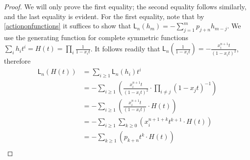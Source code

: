 \documentclass[10pt,a4paper]{amsart}
\newcommand{\LLn}[1][n]{{\mathsf{L}_{#1}}}
\begin{document}
\begin{proof}
    We will only prove the first equality; the second equality follows similarly, and the last equality is evident.
    For the first equality, note that by \eqref{actiononfunctions} it suffices to show that $\LLn(h_m) = - \sum_{j = 1}^m p_{j+n} h_{m-j}$. We use the  generating function for complete symmetric functions $\sum_i h_i t^i = H(t) = \prod_{i} \frac{1}{1-x_i t}$. It follows readily that $\LLn[n]( \frac{1}{1-x_i t}) = - \frac{x_i^{n+1}t}{(1 - x_i t)^2}$, therefore
    \begin{align*}
        \LLn[n](H(t)) &= \sum_{i \geq 1} \LLn[n](h_i)t^i \\
        &= -\sum_{i \geq 1}\left(\frac{x_i^{n+1}t}{(1 - x_i t)^2} \cdot \prod_{i \neq j} (1 - x_jt)^{-1} \right) \\
        &= -\sum_{i \geq 1} \left(\frac{x_i^{n+1}t}{(1 - x_i t)} \cdot H(t) \right) \\
        &= -\sum_{i \geq 1} \sum_{k \geq 0} \left(x_i^{n+1+k}t^{k+1} \cdot H(t) \right) \\
        &= - \sum_{k \geq 1} \left(p_{k+n}t^{k} \cdot H(t) \right) \\
    \end{align*}

\end{proof}
\end{document}

